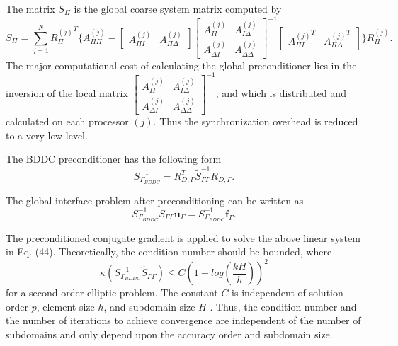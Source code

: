 The matrix $ S_{\Pi} $ is the global coarse system matrix computed by
\begin{equation}\label{eq:bddc2}
S_{\Pi} = \sum_{j = 1}^{N} {R_{\Pi}^{(j)}}^{T} \{ A_{\Pi \Pi}^{(j)} - \begin{bmatrix}
A_{\Pi I}^{(j)} & A_{\Pi \Delta}^{(j)}
\end{bmatrix}  \begin{bmatrix}
A_{II}^{(j)} & A_{I\Delta}^{(j)} \\
A_{\Delta I}^{(j)} & A_{\Delta \Delta}^{(j)}
\end{bmatrix}^{-1} \begin{bmatrix}
{A_{\Pi I}^{(j)}}^{T} & {A_{\Pi \Delta}^{(j)}}^{T}
\end{bmatrix} \} R_{\Pi}^{(j)} .
\end{equation}
The major computational cost of calculating the global preconditioner lies in the inversion of the local matrix $ \begin{bmatrix}
A_{II}^{(j)} & A_{I\Delta}^{(j)} \\
A_{\Delta I}^{(j)} & A_{\Delta \Delta}^{(j)}
\end{bmatrix}^{-1}  $, and which is distributed and calculated on each processor $ (j) $. Thus the synchronization overhead is reduced to a very low level.

The BDDC preconditioner has the following form
\begin{equation}
S_{\Gamma_{BDDC}}^{-1} = R_{D, \Gamma}^{T} \tilde{S}_{\Gamma\Gamma}^{-1} R_{D, \Gamma}.
\end{equation}

The global interface problem after preconditioning can be written as
\begin{equation}
S_{\Gamma_{BDDC}}^{-1} S_{\Gamma \Gamma} \mathbf{u}_{\Gamma} = S_{\Gamma_{BDDC}}^{-1} \mathbf{f}_{\Gamma}.
\end{equation}

The preconditioned conjugate gradient is applied to solve the above linear system in Eq. (44). Theoretically, the condition number should be bounded, where
\begin{equation}
\kappa (S_{\Gamma_{BDDC}}^{-1} \hat{S}_{\Gamma \Gamma}) \leq C (1 + log (\frac{kH}{h}))^{2}
\end{equation}
for a second order elliptic problem. The constant $ C $  is independent of solution order $ p $, element size $ h $,  and subdomain size $ H $ . Thus, the condition number and the number of iterations to achieve convergence are independent of the number of subdomains and only depend upon the accuracy order and subdomain size.  

